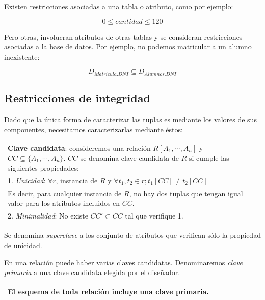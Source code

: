 \documentclass[10pt,a4paper,spanish]{report}
\begin{document}
Existen restricciones asociadas a una tabla o atributo, como por ejemplo:

\begin{displaymath}
0 \leq cantidad \leq 120
\end{displaymath}

Pero otras, involucran atributos de otras tablas y se consideran restricciones asociadas a la base de datos. Por ejemplo, no podemos matricular a un alumno inexistente:

\begin{displaymath}
D_{Matricula.DNI} \subseteq D_{Alumnos.DNI}
\end{displaymath}

\textcolor[rgb]{1,0.2,0.3}{\section{Restricciones de integridad}}
Dado que la única forma de caracterizar las tuplas es mediante los valores de sus componentes, necesitamos caracterizarlas mediante éstos:

\begin{center}
\begin{tabular}{|p{12cm}|}
\hline
\textcolor[rgb]{1,0.2,0.3}{\textbf{Clave candidata}}: consideremos una relación $R[A_1, \cdots, A_n]$ y $CC \subseteq \{A_1, \cdots, A_n\}$. $CC$ se denomina clave candidata de $R$ si cumple las siguientes propiedades: \\
1. \textcolor[rgb]{1,0.2,0.3}{\textit{Unicidad}}: $\forall r$, instancia de $R$ y $\forall t_1, t_2 \in r ; t_1[CC] \neq t_2[CC]$ \\
Es decir, para cualquier instancia de $R$, no hay dos tuplas que tengan igual valor para los atributos incluidos en $CC$. \\
2. \textit{\textcolor[rgb]{1,0.2,0.3}{Minimalidad}}: No existe $CC' \subset CC$ tal que verifique 1. \\
\hline
\end{tabular} 
\end{center}

Se denomina \textcolor[rgb]{1,0.2,0.3}{\textit{superclave}} a los conjunto de atributos que verifican sólo la propiedad de unicidad.

En una relación puede haber varias claves candidatas. Denominaremos \textit{\textcolor[rgb]{1,0.2,0.3}{clave primaria}} a una clave candidata elegida por el diseñador.

\begin{center}
\begin{tabular}{p{6cm}}
\hline
El esquema de toda relación incluye una clave primaria.\\
\hline
\end{tabular}
\end{center}
\end{document}
